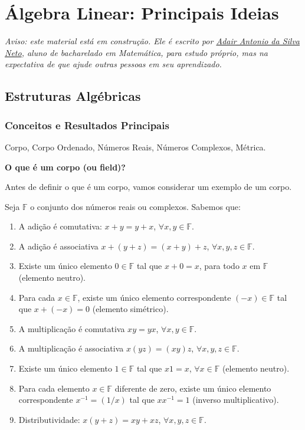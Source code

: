 \documentclass[
]{article}
\author{}
\date{}
\begin{document}
\hypertarget{uxe1lgebra-linear-principais-ideias}{%
\section{Álgebra Linear: Principais
Ideias}\label{uxe1lgebra-linear-principais-ideias}}

\emph{Aviso: este material está em construção. Ele é escrito por
\href{https://adairneto.github.io/}{Adair Antonio da Silva Neto}, aluno
de bacharelado em Matemática, para estudo próprio, mas na expectativa de
que ajude outras pessoas em seu aprendizado.}

\hypertarget{estruturas-alguxe9bricas}{%
\subsection{Estruturas Algébricas}\label{estruturas-alguxe9bricas}}

\hypertarget{conceitos-e-resultados-principais-1}{%
\subsubsection{Conceitos e Resultados
Principais}\label{conceitos-e-resultados-principais-1}}

Corpo, Corpo Ordenado, Números Reais, Números Complexos, Métrica.

\textbf{O que é um corpo (ou field)?}

Antes de definir o que é um corpo, vamos considerar um exemplo de um
corpo.

Seja \(\mathbb{F}\) o conjunto dos números reais ou complexos. Sabemos
que:

\begin{enumerate}
\def\labelenumi{\arabic{enumi}.}
\item
  A adição é comutativa: \(x+y = y+x\), \(\forall x, y \in \mathbb{F}\).
\item
  A adição é associativa \(x + (y+z) = (x+y) + z\),
  \(\forall x, y, z \in \mathbb{F}\).
\item
  Existe um único elemento \(0 \in \mathbb{F}\) tal que \(x+0 = x\),
  para todo \(x\) em \(\mathbb{F}\) (elemento neutro).
\item
  Para cada \(x \in \mathbb{F}\), existe um único elemento
  correspondente \((-x) \in \mathbb{F}\) tal que \(x + (-x) = 0\)
  (elemento simétrico).
\item
  A multiplicação é comutativa \(xy = yx\),
  \(\forall x,y \in \mathbb{F}\).
\item
  A multiplicação é associativa \(x(yz) = (xy)z\),
  \(\forall x, y, z \in \mathbb{F}\).
\item
  Existe um único elemento \(1 \in \mathbb{F}\) tal que \(x1 = x\),
  \(\forall x \in \mathbb{F}\) (elemento neutro).
\item
  Para cada elemento \(x \in \mathbb{F}\) diferente de zero, existe um
  único elemento correspondente \(x^{-1} = (1/x)\) tal que
  \(xx^{-1} = 1\) (inverso multiplicativo).
\item
  Distributividade: \(x(y+z) = xy + xz\),
  \(\forall x,y,z \in \mathbb{F}\).
\end{enumerate}
\end{document}
